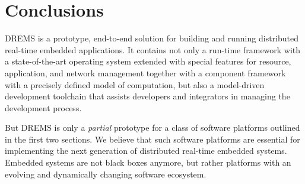 \section{Conclusions}
\label{sec:conclusions}

DREMS is a prototype, end-to-end solution for building and running
distributed real-time embedded applications. It contains not only a
run-time framework with a state-of-the-art operating system extended
with special features for resource, application, and network
management together with a component framework with a precisely defined
model of computation, but also a model-driven development toolchain
that assists developers and integrators in managing the development
process.

But DREMS is only a \textit{partial} prototype for a class of software
platforms outlined in the first two sections. We believe that such
software platforms are essential for implementing the next generation
of distributed real-time embedded systems. Embedded systems are not
black boxes anymore, but rather platforms with an evolving and
dynamically changing software ecosystem.
